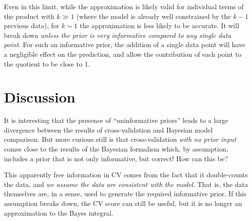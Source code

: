 \documentclass[12pt]{article}
\begin{document}
Even in this limit, while the approximation is likely valid for individual
terms of the product with $k \gg 1$
(where the model is already well constrained by the $k-1$ previous data),
for $k \sim 1$ the approximation is less likely to be accurate.
It will break down
{\it unless the prior is very informative compared to any single data point}.
For such an informative prior, the addition of a single data point will
have a negligible effect on the prediction, and allow the contribution 
of each point to the quotient to be close to 1.

\section{Discussion}
It is interesting that the presence of ``uninformative priors'' leads to a
large divergence between the results of cross-validation and Bayesian model
comparison.  But more curious still is that cross-validation {\it with no
prior input} comes close to the results of the Bayesian formalism which,
by assumption, includes a prior that is not only informative, but correct!
How can this be?

This apparently free information in CV comes from the fact that it
double-counts the data, and {\it we assume the data are consistent with the
model}.  That is, the data themselves are, in a sense, used to generate
the required informative prior.  If this assumption breaks down, the CV
score can still be useful, but it is no longer an approximation to the
Bayes integral.
\end{document}
